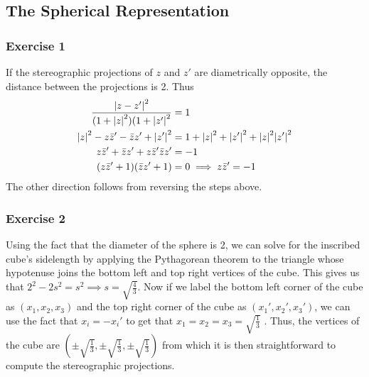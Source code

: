 \subsection{The Spherical Representation}

\subsubsection{Exercise 1}
If the stereographic projections of $z$ and $z'$ are diametrically opposite, the distance between the 
projections is 2. Thus
\begin{align*}
        \frac{\abs{z - z'}^2}{(1 + \abs{z}^2) (1 + \abs{z'}^2} &= 1 \\
        \abs{z}^2 -z\bar{z}' - \bar{z}z' + \abs{z'}^2 &= 1 + \abs{z}^2 + \abs{z'}^2 + \abs{z}^2 \abs{z'}^2 \\
        z\bar{z}' + \bar{z}z' + z\bar{z}' \bar{z}z' &= -1 \\
        (z\bar{z}' + 1)(\bar{z}z' + 1) &= 0 \implies z\bar{z}' = -1
\end{align*}
The other direction follows from reversing the steps above.

\subsubsection{Exercise 2}
Using the fact that the diameter of the sphere is 2, we can solve for the inscribed cube's sidelength by 
applying the Pythagorean theorem to the triangle whose hypotenuse joins the bottom left and top right 
vertices of the cube. This gives us that $2^2 - 2s^2 = s^2 \implies s = \sqrt{\frac{4}{3}}$. Now if we 
label the bottom left corner of the cube as $(x_1, x_2, x_3)$ and the top right corner of the cube as
$(x_1', x_2', x_3')$, we can use the fact that $x_i = -x_i'$ to get that $x_1 = x_2 = x_3 = \sqrt{\frac{1}{3}}$ 
. Thus, the vertices of the cube are $(\pm \sqrt{\frac{1}{3}}, \pm \sqrt{\frac{1}{3}}, \pm \sqrt{\frac{1}{3}})$
from which it is then straightforward to compute the stereographic projections.
